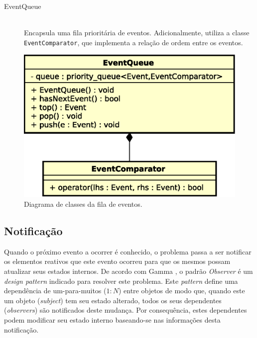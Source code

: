 \begin{description}
  \item[EventQueue] \hfill \\
    Encapsula uma fila prioritária de eventos. Adicionalmente, utiliza a classe
    \texttt{EventComparator}, que implementa a relação de ordem entre os
    eventos.

\end{description}

\begin{figure}[htb!]
  \centering
  \includegraphics[scale=0.6]{img/EventQueue}
  \caption{Diagrama de classes da fila de eventos.}
\label{fig:diagram:event:manage}
\end{figure}

\subsection{Notificação}

Quando o próximo evento a ocorrer é conhecido, o problema passa a ser notificar
os elementos reativos que este evento ocorreu para que os mesmos possam
atualizar seus estados internos. De acordo com Gamma
\cite{Gamma:1995:DPE:186897}, o padrão \textit{Observer} é um \textit{design
pattern} indicado para resolver este problema. Este \textit{pattern} define uma
dependência de um-para-muitos ($1:N$) entre objetos de modo que, quando este um
objeto (\textit{subject}) tem seu estado alterado, todos os seus dependentes
(\textit{observers}) são notificados deste mudança. Por consequência, estes
dependentes podem modificar seu estado interno baseando-se nas informações desta
notificação.

